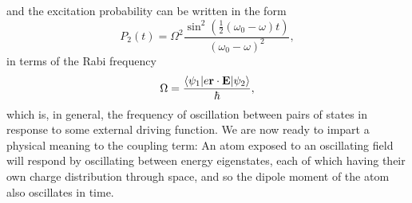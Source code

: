 	and the excitation probability can be written in the form \cite{FootAtomic,BinneyBook}
	\begin{equation}
		P_2(t) = \Omega^2 \frac{\sin^2(\frac{1}{2}(\omega_0-\omega)t)}{(\omega_0-\omega)^2},
		\label{eqn:transition_prob}
	\end{equation}
	in terms of the Rabi frequency
	\begin{equation}
		\Omega = \frac{\langle\psi_1|e\textbf{r}\cdot\textbf{E}|\psi_2\rangle}{\hbar},
	\end{equation}
	which is, in general, the frequency of oscillation between pairs of states in response to some external driving function.
	We are now ready to impart a physical meaning to the coupling term: An atom exposed to an oscillating field will respond by oscillating between energy eigenstates, each of which having their own charge distribution through space, and so the dipole moment of the atom also oscillates in time.
	
